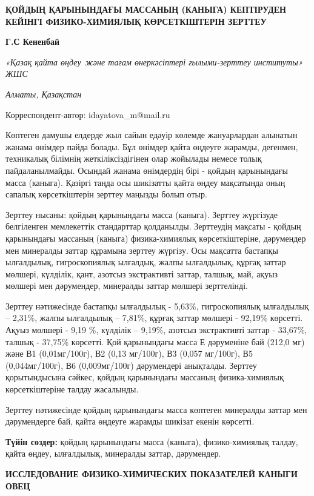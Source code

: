 
{\bfseries ҚОЙДЫҢ ҚАРЫНЫНДАҒЫ МАССАНЫҢ (КАНЫГА) КЕПТІРУДЕН КЕЙІНГІ
ФИЗИКО-ХИМИЯЛЫҚ КӨРСЕТКІШТЕРІН ЗЕРТТЕУ}

{\bfseries Г.С
Кененбай}
\envelope 

\emph{«Қазақ қайта өңдеу~және тағам өнеркәсіптері ғылыми-зерттеу
институты» ЖШС}

\emph{Алматы, Қазақстан}

\envelope Корреспондент-автор:
idayatova_m@mail.ru

Көптеген дамушы елдерде жыл сайын едәуір көлемде жануарлардан алынатын
жанама өнімдер пайда болады. Бұл өнімдер қайта өңдеуге жарамды,
дегенмен, техникалық білімнің жеткіліксіздігінен олар жойылады немесе
толық пайдаланылмайды. Осындай жанама өнімдердің бірі - қойдың
қарынындағы масса (каныга). Қазіргі таңда осы шикізатты қайта өңдеу
мақсатында оның сапалық көрсеткіштерін зерттеу маңызды болып отыр.

Зерттеу нысаны: қойдың қарынындағы масса (каныга). Зерттеу жүргізуде
белгіленген мемлекеттік стандарттар қолданылды. Зерттеудің мақсаты -
қойдың қарынындағы массаның (каныга) физика-химиялық көрсеткіштеріне,
дәрумендер мен минералды заттар құрамына зерттеу жүргізу. Осы мақсатта
бастапқы ылғалдылық, гигроскопиялық ылғалдық, жалпы ылғалдылық, құрғақ
заттар мөлшері, күлділік, қант, азотсыз экстрактивті заттар, талшық,
май, ақуыз мөлшері мен дәрумендер, минералды заттар мөлшері зерттелінді.

Зерттеу нәтижесінде бастапқы ылғалдылық - 5,63\%, гигроскопиялық
ылғалдылық -- 2,31\%, жалпы ылғалдылық -- 7,81\%, құрғақ заттар мөлшері
- 92,19\% көрсетті. Ақуыз мөлшері - 9,19 \%, күлділік -- 9,19\%, азотсыз
экстрактивті заттар - 33,67\%, талшық - 37,75\% көрсетті. Қой
қарынындағы масса Е дәруменіне бай (212,0 мг) және В1 (0,01мг/100г), В2
(0,13 мг/100г), В3 (0,057 мг/100г), В5 (0,044мг/100г), В6 (0,009мг/100г)
дәрумендері анықталды. Зерттеу қорытындысына сәйкес, қойдың қарынындағы
массаның физика-химиялық көрсеткіштеріне талдау жасалынды.

Зерттеу нәтижесінде қойдың қарынындағы масса көптеген минералды заттар
мен дәрумендерге бай, қайта өңдеуге жарамды шикізат екенін көрсетті.

{\bfseries Түйін сөздер:} қойдың қарынындағы масса (каныга),
физико-химиялық талдау, қайта өңдеу, ылғалдылық, минералды заттар,
дәрумендер.

{\bfseries ИССЛЕДОВАНИЕ ФИЗИКО-ХИМИЧЕСКИХ ПОКАЗАТЕЛЕЙ КАНЫГИ ОВЕЦ}

